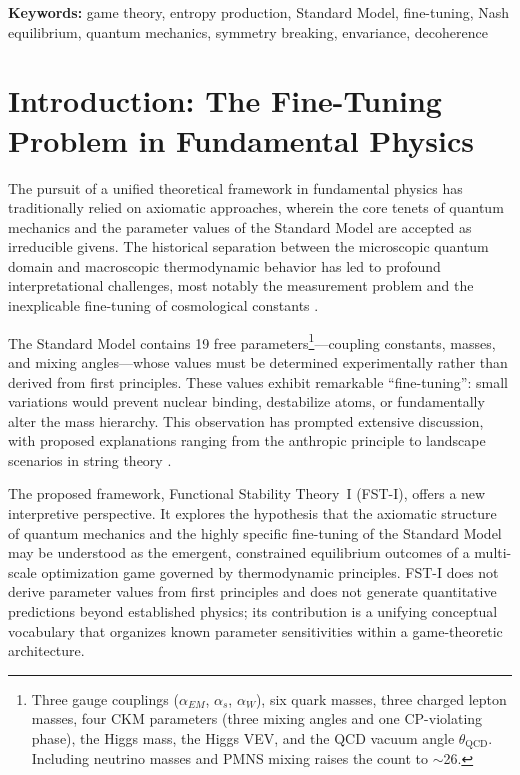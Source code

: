 \documentclass[12pt,a4paper]{article}
\theoremstyle{remark}
\begin{document}
\textbf{Keywords:} game theory, entropy production, Standard Model, fine-tuning, Nash equilibrium, quantum mechanics, symmetry breaking, envariance, decoherence

\section{Introduction: The Fine-Tuning Problem in Fundamental Physics}
\label{sec:introduction}

The pursuit of a unified theoretical framework in fundamental physics has traditionally relied on axiomatic approaches, wherein the core tenets of quantum mechanics and the parameter values of the Standard Model are accepted as irreducible givens. The historical separation between the microscopic quantum domain and macroscopic thermodynamic behavior has led to profound interpretational challenges, most notably the measurement problem and the inexplicable fine-tuning of cosmological constants \citep{Adams2019}.

The Standard Model contains 19 free parameters\footnote{Three gauge couplings ($\alpha_{EM}$, $\alpha_s$, $\alpha_W$), six quark masses, three charged lepton masses, four CKM parameters (three mixing angles and one CP-violating phase), the Higgs mass, the Higgs VEV, and the QCD vacuum angle $\theta_{\text{QCD}}$. Including neutrino masses and PMNS mixing raises the count to $\sim$26.}---coupling constants, masses, and mixing angles---whose values must be determined experimentally rather than derived from first principles. These values exhibit remarkable ``fine-tuning'': small variations would prevent nuclear binding, destabilize atoms, or fundamentally alter the mass hierarchy. This observation has prompted extensive discussion, with proposed explanations ranging from the anthropic principle \citep{Weinberg1987,Susskind2005} to landscape scenarios in string theory \citep{Bousso2000}.

The proposed framework, Functional Stability Theory~I (FST-I), offers a new interpretive perspective. It explores the hypothesis that the axiomatic structure of quantum mechanics and the highly specific fine-tuning of the Standard Model may be understood as the emergent, constrained equilibrium outcomes of a multi-scale optimization game governed by thermodynamic principles. FST-I does not derive parameter values from first principles and does not generate quantitative predictions beyond established physics; its contribution is a unifying conceptual vocabulary that organizes known parameter sensitivities within a game-theoretic architecture.
\end{document}
